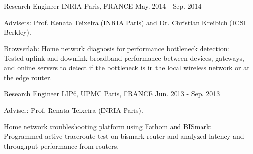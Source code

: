 \begin{cventries}
{\begin{cvitems}
{     		}
      \end{cvitems}
    }

  \cventry
    {Research Engineer} %
    {INRIA} %
    {Paris, FRANCE} %
    {May. 2014 - Sep. 2014} %
    {
      \begin{cvitems} %
      \item {Advisers: Prof. Renata Teixeira (INRIA Paris) and Dr. Christian Kreibich (ICSI Berkley).}
%      
      \item {Browserlab: Home network diagnosis for performance bottleneck detection: Tested uplink and downlink broadband performance between devices, gateways, and online servers to detect if the bottleneck is in the local wireless network or at the edge router.}
%      
      \end{cvitems}
    }
    
  \cventry
    {Research Engineer} %
    {LIP6, UPMC} %
    {Paris, FRANCE} %
    {Jun. 2013 - Sep. 2013} %
    {
      \begin{cvitems} %
      \item {Adviser: Prof. Renata Teixeira (INRIA Paris).}
%      
      \item {Home network troubleshooting platform using Fathom and BISmark: Programmed active traceroute test on bismark router and analyzed latency and throughput performance from routers.}
%      
      \end{cvitems}
    }


\end{cventries}
